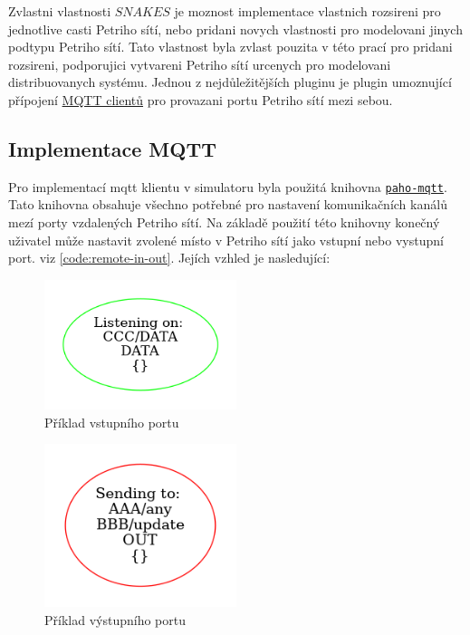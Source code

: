 Zvlastni vlastnosti $SNAKES$ je moznost implementace vlastnich rozsireni pro jednotlive casti Petriho sítí, nebo pridani novych vlastnosti pro modelovani jinych podtypu Petriho sítí. Tato vlastnost byla zvlast pouzita v této prací pro pridani rozsireni, podporujici vytvareni Petriho sítí urcenych pro modelovani distribuovanych systému.
Jednou z nejdůležitějších pluginu je plugin umoznující přípojení \hyperref[sec:aplikace-mqtt]{MQTT clientů} pro provazani portu Petriho sítí mezi sebou.

\subsection{Implementace MQTT}
\label{subsec:mqtt_impl}
Pro implementací mqtt klientu v simulatoru byla použitá knihovna \href{https://pypi.org/project/paho-mqtt/}{\texttt{paho-mqtt}}. Tato knihovna obsahuje všechno potřebné pro nastavení komunikačních kanálů mezí porty vzdalených Petriho sítí. Na základě použití této knihovny konečný uživatel může nastavit zvolené místo v Petriho sítí jako vstupní nebo vystupní port. viz \ref{code:remote-in-out}. Jejích vzhled je nasledující:
\begin{figure}[hbt]
  \centering
  \includegraphics[width=0.5\textwidth]{obrazky-figures/port-in.png}
  \caption{Příklad vstupního portu}
  \label{port-in}
\end{figure}

\begin{figure}[hbt]
  \centering
  \includegraphics[width=0.5\textwidth]{obrazky-figures/port-out.png}
  \caption{Příklad výstupního portu}
  \label{port-out}
\end{figure}

